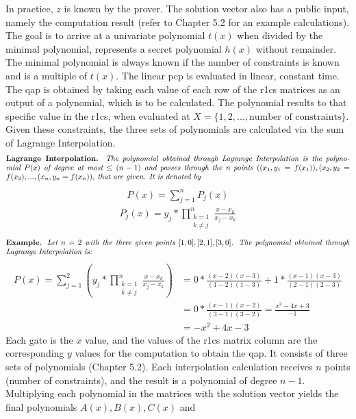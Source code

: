 In practice, \(z\) is known by the prover. The solution vector also has a public input, namely the computation result (refer to Chapter 5.2 for an example calculations). The goal is to arrive at a univariate polynomial \(t(x)\) when divided by the minimal polynomial, represents a secret polynomial \(h(x)\) without remainder. The minimal polynomial is always known if the number of constraints is known and is a multiple of \(t(x)\). The linear \acrshort{pcp} is evaluated in linear, constant time. The \acrshort{qap} is obtained by taking each value of each row of the \acrshort{r1cs} matrices as an output of a polynomial, which is to be calculated. The polynomial results to that specific value in the \acrshort{r1cs}, when evaluated at \(X = \{1, 2, ..., \text{number of constraints}\}\). Given these constraints, the three sets of polynomials are calculated via the sum of Lagrange Interpolation.
\begin{align*}
    \text{\parbox{450pt}{\textbf{Lagrange Interpolation.} \textit{The polynomial obtained through Lagrange Interpolation is the polynomial \(P(x)\) of degree at most \(\leq (n-1)\) and passes through the n points \(((x_1, y_1 = f(x_1)), (x_2, y_2 = f(x_2), ..., (x_n, y_n = f(x_n))\), that are given. It is denoted by}}}
\end{align*}
\begin{align}
        P(x) = \sum_{j=1}^{n} P_j(x)
\end{align}
\begin{align*}
        P_j(x) = y_j * \prod_{\substack{k = 1 \\ k \neq j}}^{n}\frac{x-x_k}{x_j-x_k}
\end{align*}
\begin{align*}
    \text{\parbox{450pt}{\textbf{Example.} \textit{Let \(n = 2\) with the three given points \([1,0], [2,1], [3,0]\). The polynomial obtained through Lagrange Interpolation is: 
    }}}
\end{align*}
\begin{align*}
    P(x) = \sum_{j=1}^{2}\left(y_j*\prod_{\substack{k = 1 \\ k \neq j}}^{n}\frac{x-x_k}{x_j-x_k}\right)
    &= 0 * \frac{(x-2)(x-3)}{(1-2)(1-3)}+1*\frac{(x-1)(x-3)}{(2-1)(2-3)}\\
    &= 0 * \frac{(x-1)(x-2)}{(3-1)(3-2)} = \frac{x^2-4x+3}{-1}\\
    &= -x^2+4x-3
\end{align*}
Each gate is the \(x\) value, and the values of the \acrshort{r1cs} matrix column are the corresponding \(y\) values for the computation to obtain the \acrshort{qap}. It consists of three sets of polynomials (Chapter 5.2). Each interpolation calculation receives \(n\) points (number of constraints), and the result is a polynomial of degree \(n-1\). Multiplying each polynomial in the matrices with the solution vector yields the final polynomials \(A(x), B(x), C(x)\) and
